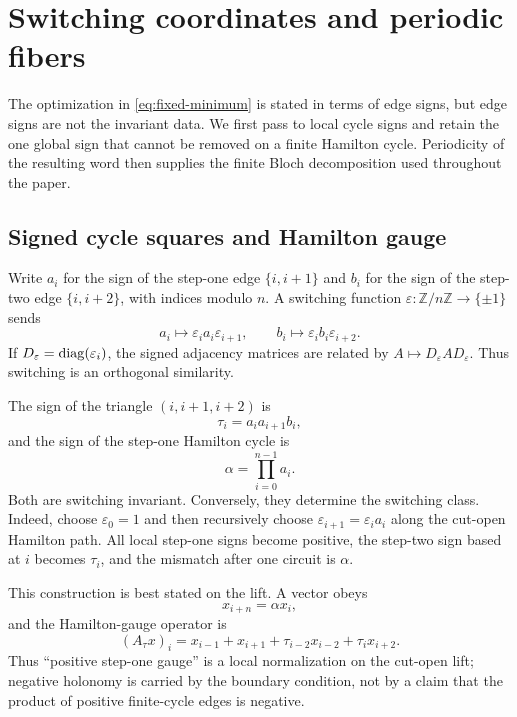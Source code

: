 \section{Switching coordinates and periodic fibers}
\label{sec:gauge}

The optimization in \eqref{eq:fixed-minimum} is stated in terms of edge
signs, but edge signs are not the invariant data.  We first pass to local
cycle signs and retain the one global sign that cannot be removed on a finite
Hamilton cycle.  Periodicity of the resulting word then supplies the finite
Bloch decomposition used throughout the paper.

\subsection{Signed cycle squares and Hamilton gauge}

Write $a_i$ for the sign of the step-one edge $\{i,i+1\}$ and $b_i$ for the
sign of the step-two edge $\{i,i+2\}$, with indices modulo $n$.  A switching
function $\varepsilon: \mathbb Z/n\mathbb Z\to\{\pm1\}$ sends
\[
 a_i\longmapsto \varepsilon_i a_i\varepsilon_{i+1},
 \qquad
 b_i\longmapsto \varepsilon_i b_i\varepsilon_{i+2}.
\]
If $D_\varepsilon=\operatorname{diag}(\varepsilon_i)$, the signed adjacency matrices are
related by $A\mapsto D_\varepsilon A D_\varepsilon$.  Thus switching is an
orthogonal similarity.

The sign of the triangle $(i,i+1,i+2)$ is
\begin{equation}
 \tau_i=a_i a_{i+1}b_i,
 \label{eq:triangle-flux}
\end{equation}
and the sign of the step-one Hamilton cycle is
\begin{equation}
 \alpha=\prod_{i=0}^{n-1}a_i.
 \label{eq:ham-holonomy}
\end{equation}
Both are switching invariant.  Conversely, they determine the switching
class.  Indeed, choose $\varepsilon_0=1$ and then recursively choose
$\varepsilon_{i+1}=\varepsilon_i a_i$ along the cut-open Hamilton path.  All
local step-one signs become positive, the step-two sign based at $i$ becomes
$\tau_i$, and the mismatch after one circuit is $\alpha$.

This construction is best stated on the lift.  A vector obeys
\begin{equation}
 x_{i+n}=\alpha x_i,
 \label{eq:finite-holonomy-boundary}
\end{equation}
and the Hamilton-gauge operator is
\begin{equation}
 (A_\tau x)_i=x_{i-1}+x_{i+1}
   +\tau_{i-2}x_{i-2}+\tau_i x_{i+2}.
 \label{eq:hamilton-operator}
\end{equation}
Thus ``positive step-one gauge'' is a local normalization on the cut-open
lift; negative holonomy is carried by the boundary condition, not by a claim
that the product of positive finite-cycle edges is negative.


